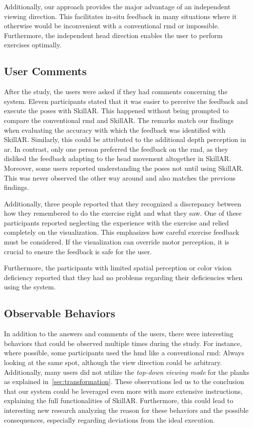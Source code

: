 Additionally, our approach provides the major advantage of an independent viewing direction. This facilitates in-situ feedback in many situations where it otherwise would be inconvenient with a conventional \acrshort{rmd} or impossible. Furthermore, the independent head direction enables the user to perform exercises optimally.
\subsection{User Comments \label{sec:comments}}
After the study, the users were asked if they had comments concerning the system. Eleven participants stated that it was easier to perceive the feedback and execute the poses with SkillAR. This happened without being prompted to compare the conventional \acrshort{rmd} and SkillAR. The remarks match our findings when evaluating the accuracy with which the feedback was identified with SkillAR. Similarly, this could be attributed to the additional depth perception in \acrshort{ar}. In contrast, only one person preferred the feedback on the \acrshort{rmd}, as they disliked the feedback adapting to the head movement altogether in SkillAR. Moreover, some users reported understanding the poses not until using SkillAR. This was never observed the other way around and also matches the previous findings.

Additionally, three people reported that they recognized a discrepancy between how they remembered to do the exercise right and what they saw. One of these participants reported neglecting the experience with the exercise and relied completely on the visualization. This emphasizes how careful exercise feedback must be considered. If the visualization can override motor perception, it is crucial to ensure the feedback is safe for the user.

Furthermore, the participants with limited spatial perception or color vision deficiency reported that they had no problems regarding their deficiencies when using the system.

\subsection{Observable Behaviors \label{sec:behaviors}}
In addition to the answers and comments of the users, there were interesting behaviors that could be observed multiple times during the study. For instance, where possible, some participants used the \acrshort{hmd} like a conventional \acrshort{rmd}: Always looking at the same spot, although the view direction could be arbitrary. Additionally, many users did not utilize the \emph{top-down viewing mode} for the planks as explained in~\autoref{sec:transformation}. These observations led us to the conclusion that our system could be leveraged even more with more extensive instructions, explaining the full functionalities of SkillAR. Furthermore, this could lead to interesting new research analyzing the reason for these behaviors and the possible consequences, especially regarding deviations from the ideal execution.

